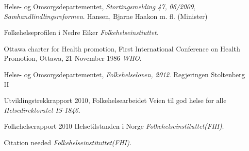 \documentclass[11pt]{memoir} %
\begin{document}
 \renewcommand{\bibname}{Kilder:}
              \begin{thebibliography}{99}

                  Helse- og Omsorgsdepartementet,
                  \emph{Stortingsmelding 47, 06/2009, Samhandlindlingsreformen}.
                  Hansen, Bjarne Haakon m. fl. (Minister)

                  Folkehelseprofilen i Nedre Eiker
                  \emph{Folkehelseinstiuttet}.
                  
                  Ottawa charter for Health promotion,
                  First International Conference on Health Promotion, Ottawa, 21 November 1986
                  \emph{WHO}.

                  Helse- og Omsorgsdepartementet,
                  \emph{Folkehelseloven, 2012}.
                  Regjeringen Stoltenberg II


                  Utviklingstrekkrapport 2010, Folkehelsearbeidet
                  Veien til god helse for alle
                  \emph{Helsedirektoratet IS-1846}.

                  Folkehelserapport 2010
                  Helsetilstanden i Norge
                  \emph{Folkehelseinstituttet(FHI)}.
                 
                 \bibitem{!!!}
                  Citation needed
                  \emph{Folkehelseinstituttet(FHI)}.

\end{thebibliography}
\end{document}
